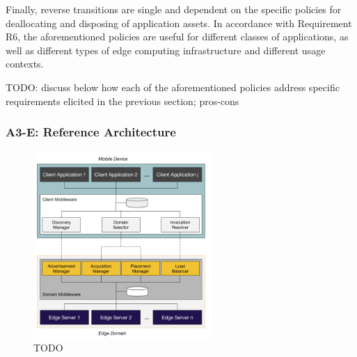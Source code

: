 Finally, reverse transitions are single and dependent on the specific policies for deallocating and disposing of application assets. 
In accordance with Requirement R6, the aforementioned policies are useful for different classes of applications, as well as different types of edge computing infrastructure and different usage contexts.


TODO: discuss below how each of the aforementioned policies address specific requirements elicited in the previous section; pros-cons

\subsubsection{A3-E: Reference Architecture}\label{sec:a3-e-reference-architecture}

\begin{figure}
  \includegraphics[width=0.6\textwidth]{figs/reference-architecture.png}
  \caption{TODO}
  \label{fig:reference-architecture}
\end{figure}

